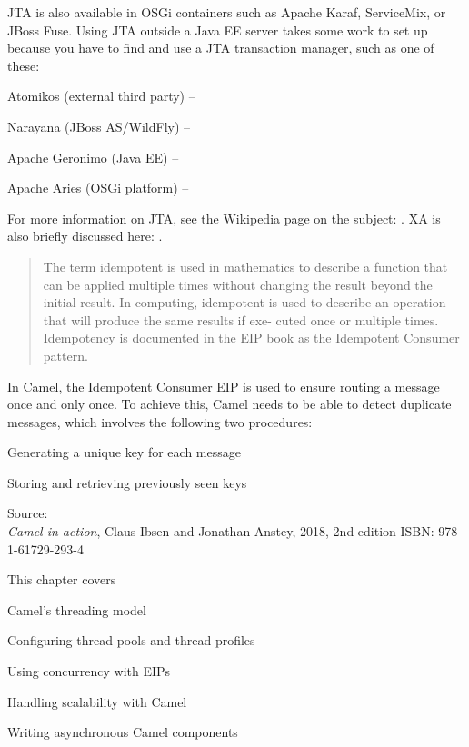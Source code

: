 \documentclass[Screen16to9,17pt]{foils}
\begin{document}
JTA is also available in OSGi containers such as Apache Karaf, ServiceMix, or JBoss
Fuse. Using JTA outside a Java EE server takes some work to set up because you have to
find and use a JTA transaction manager, such as one of these:
\begin{list2}
\item Atomikos (external third party) -- 
\item  Narayana (JBoss AS/WildFly) -- 
\item  Apache Geronimo (Java EE) -- 
\item  Apache Aries (OSGi platform) -- 
\end{list2}

For more information on JTA, see the Wikipedia page on the subject:
 . XA is also briefly discussed here:  .



\begin{quote}
  The term idempotent is used in mathematics to describe a function that can be applied
  multiple times without changing the result beyond the initial result. In computing,
  idempotent is used to describe an operation that will produce the same results if exe-
  cuted once or multiple times.
  Idempotency is documented in the EIP book as the Idempotent Consumer pattern.
\end{quote}

In Camel, the Idempotent Consumer EIP is used to ensure routing a message once
and only once. To achieve this, Camel needs to be able to detect duplicate messages,
which involves the following two procedures:

\begin{list2}
\item Generating a unique key for each message
\item Storing and retrieving previously seen keys
\end{list2}

Source: {\footnotesize\\
\emph{Camel in action}, Claus Ibsen and Jonathan Anstey, 2018, 2nd edition
ISBN: 978-1-61729-293-4}


This chapter covers
\begin{list2}
\item Camel’s threading model
\item Configuring thread pools and thread profiles
\item Using concurrency with EIPs
\item Handling scalability with Camel
\item Writing asynchronous Camel components
\end{list2}
\end{document}
